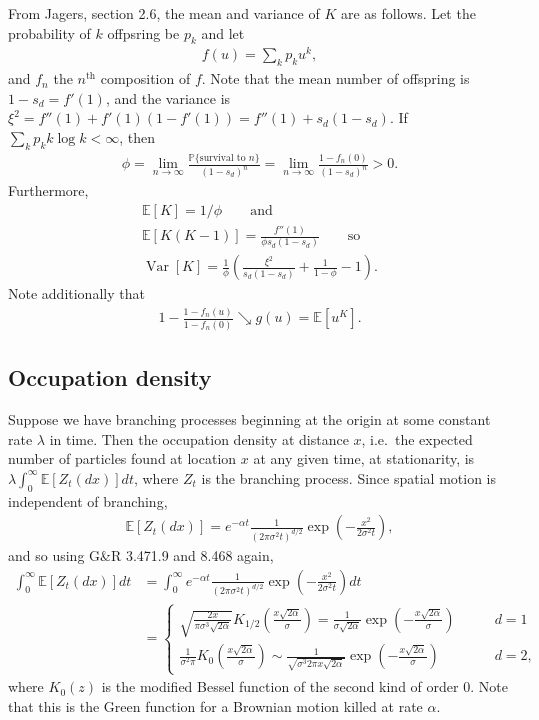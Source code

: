 \documentclass{article}
\newcommand{\E}{\mathbb{E}}
\renewcommand{\P}{\mathbb{P}}
\newcommand{\var}{\mathop{\mbox{Var}}}
\begin{document}
From Jagers, section 2.6,
the mean and variance of $K$ are as follows.
Let the probability of $k$ offpsring be $p_k$ and let
\begin{align}
 f(u) =  \sum_k p_k u^k,
\end{align}
and $f_n$ the $n^\mathrm{th}$ composition of $f$.
Note that the mean number of offspring is $1-s_d = f'(1)$, and the variance is $\xi^2 = f''(1) + f'(1)(1-f'(1)) = f''(1) + s_d(1-s_d)$.
If $\sum_k p_k k \log k < \infty$, then 
\begin{align}
\phi = \lim_{n \to \infty} \frac{ \P\{ \mbox{survival to }n \}  }{ (1-s_d)^n } = \lim_{n \to \infty} \frac{ 1-f_n(0) }{ (1-s_d)^n } > 0 .
\end{align}
Furthermore,
\begin{gather*}
\E[K] = 1/\phi \qquad \mbox{and} \\
\E[K(K-1)] = \frac{ f''(1) }{ \phi s_d (1-s_d) } \qquad \mbox{so} \\
\var[K] = \frac{1}{\phi} \left( \frac{ \xi^2 }{ s_d (1-s_d) } + \frac{1}{1-\phi} - 1 \right) .
\end{gather*}
Note additionally that 
\begin{align}
    1 - \frac{1-f_n(u)}{1-f_n(0)} \searrow g(u) = \E[u^K] .
\end{align}

\subsection{Occupation density}

Suppose we have branching processes beginning at the origin at some constant rate $\lambda$ in time.
Then the occupation density at distance $x$, i.e.\ the expected number of particles found at location $x$ at any given time, at stationarity,
is $\lambda \int_0^\infty \E[Z_t(dx)] dt$, where $Z_t$ is the branching process.
Since spatial motion is independent of branching,
\begin{align}
  \E[Z_t(dx)] = e^{-\alpha t} \frac{1}{(2\pi \sigma^2 t)^{d/2}} \exp\left(-\frac{x^2}{2\sigma^2 t} \right) ,
\end{align}
and so using G\&R 3.471.9 and 8.468 again,
\begin{align} \label{eqn:bp_occupation}
  \int_0^\infty \E[Z_t(dx)] dt  &= \int_0^\infty e^{-\alpha t} \frac{1}{(2\pi \sigma^2 t)^{d/2}} \exp\left(-\frac{x^2}{2\sigma^2 t} \right) dt \\
  &= \begin{cases}
    \sqrt{ \frac{ 2 x }{ \pi \sigma^{3} \sqrt{2\alpha} } }  K_{1/2} \left(\frac{x \sqrt{2\alpha}}{\sigma}\right) =
    \frac{1}{\sigma \sqrt{2 \alpha}} \exp\left( - \frac{ x \sqrt{2\alpha} }{ \sigma } \right) \qquad & d=1 \\
    \frac{1}{\sigma^2 \pi} K_0\left(\frac{x \sqrt{2\alpha}}{\sigma}\right) 
    \sim \frac{ 1 }{ \sqrt{ \sigma^3  2\pi x \sqrt{2\alpha} } } \exp\left(-\frac{x\sqrt{2\alpha}}{\sigma}\right) \qquad & d=2  ,
\end{cases} 
\end{align}
where $K_0(z)$ is the modified Bessel function of the second kind of order 0.
Note that this is the Green function for a Brownian motion killed at rate $\alpha$.
\end{document}
